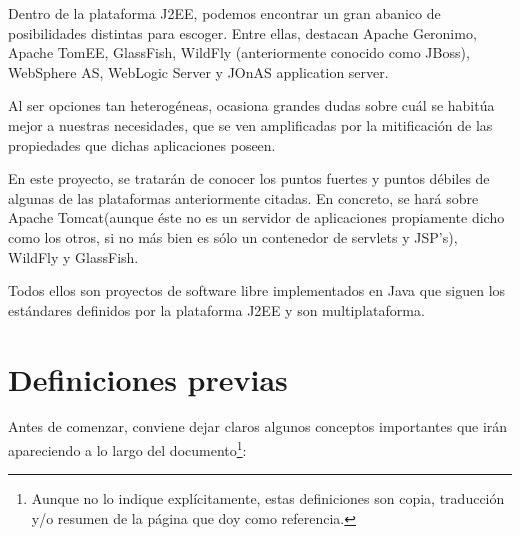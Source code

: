 \documentclass[a4paper, 10pt]{article}
\begin{document}
	Dentro de la plataforma J2EE, podemos encontrar un gran abanico de posibilidades distintas
	para escoger. Entre ellas, destacan Apache Geronimo, Apache TomEE, GlassFish, WildFly
	(anteriormente conocido como JBoss), WebSphere AS, WebLogic Server y JOnAS application
	server.
	
	Al ser opciones tan heterogéneas, ocasiona grandes dudas sobre cuál se habitúa mejor a
	nuestras necesidades, que se ven amplificadas por la mitificación de las propiedades
	que dichas aplicaciones poseen.
	
	En este proyecto, se tratarán de conocer los puntos fuertes y puntos débiles de algunas
	de las plataformas anteriormente citadas. En concreto, se hará sobre Apache Tomcat(aunque
	éste no es un servidor de aplicaciones propiamente dicho como los otros, si no más bien
	es sólo un contenedor de servlets y JSP's), WildFly y GlassFish.
	
	Todos ellos son proyectos de software libre implementados en Java que siguen los
	estándares definidos por la plataforma J2EE y son multiplataforma.
	
\section{Definiciones previas}
	Antes de comenzar, conviene dejar claros algunos conceptos importantes que irán
	apareciendo	a lo largo del documento\footnote{Aunque no lo indique explícitamente,
	estas definiciones son copia, traducción y/o resumen de la página que doy como
	referencia.}:
\end{document}
